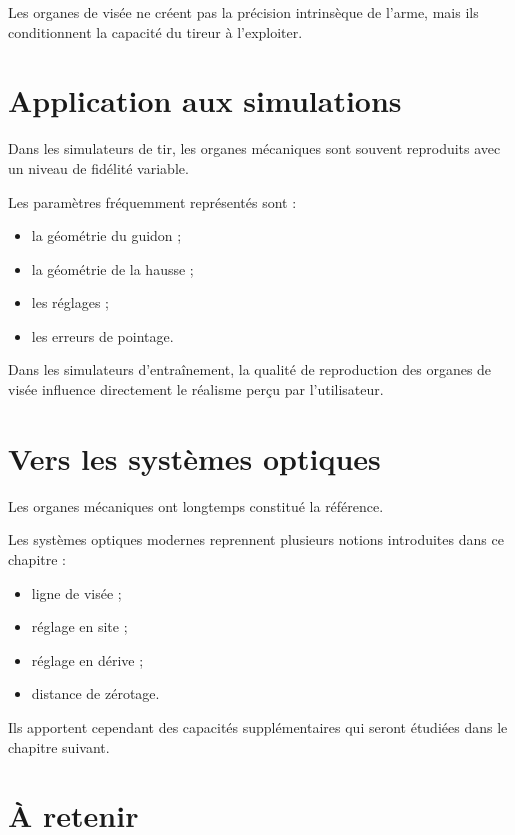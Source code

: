 Les organes de visée ne créent pas la précision intrinsèque de l'arme, mais
ils conditionnent la capacité du tireur à l'exploiter.

\section{Application aux simulations}

Dans les simulateurs de tir, les organes mécaniques sont souvent reproduits
avec un niveau de fidélité variable.

Les paramètres fréquemment représentés sont :

\begin{itemize}
    \item la géométrie du guidon ;
    \item la géométrie de la hausse ;
    \item les réglages ;
    \item les erreurs de pointage.
\end{itemize}

\begin{simulation}

Dans les simulateurs d'entraînement, la qualité de reproduction des organes
de visée influence directement le réalisme perçu par l'utilisateur.

\end{simulation}

\section{Vers les systèmes optiques}

Les organes mécaniques ont longtemps constitué la référence.

Les systèmes optiques modernes reprennent plusieurs notions introduites dans
ce chapitre :

\begin{itemize}
    \item ligne de visée ;
    \item réglage en site ;
    \item réglage en dérive ;
    \item distance de zérotage.
\end{itemize}

Ils apportent cependant des capacités supplémentaires qui seront étudiées
dans le chapitre suivant.

\section{À retenir}

